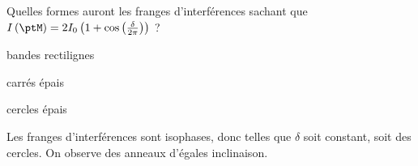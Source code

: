 



\begin{enonce}
	 Quelles formes auront les franges d'interférences sachant que $I\left(\ptM\right)=2I_0 \left(1 + \cos \left( \frac{\delta}{2\pi} \right) \right)$ ?
	\begin{listeQCM3Colonnes}
	\item bandes rectilignes
	\item carrés épais
	\item cercles épais
	\end{listeQCM3Colonnes}
	\bigskip
\end{enonce}

\reponse{\reponseC{}}

\begin{corrige}
	Les franges d'interférences sont isophases, donc telles que $\delta$ soit constant, soit des cercles. On observe des anneaux d'égales inclinaison.
\end{corrige}


\finEntrainement







